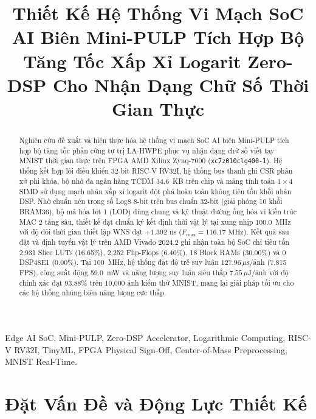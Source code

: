 \documentclass[conference]{IEEEtran}
\begin{document}
\title{Thiết Kế Hệ Thống Vi Mạch SoC AI Biên Mini-PULP Tích Hợp Bộ Tăng Tốc Xấp Xỉ Logarit Zero-DSP Cho Nhận Dạng Chữ Số Thời Gian Thực}

\author{
}

\maketitle

\begin{abstract}
Nghiên cứu đề xuất và hiện thực hóa hệ thống vi mạch SoC AI biên Mini-PULP tích hợp bộ tăng tốc phần cứng tự trị LA-HWPE phục vụ nhận dạng chữ số viết tay MNIST thời gian thực trên FPGA AMD Xilinx Zynq-7000 (\texttt{xc7z010clg400-1}). Hệ thống kết hợp lõi điều khiển 32-bit RISC-V RV32I, hệ thống bus thanh ghi CSR phân xử phi khóa, bộ nhớ đa ngân hàng TCDM 34.6~KB trên chip và mảng tính toán $1\times 4$ SIMD sử dụng mạch nhân xấp xỉ logarit đột phá hoàn toàn không tiêu tốn khối nhân DSP. Nhờ chuẩn nén trọng số Log8 8-bit trên bus chuẩn 32-bit (giải phóng 10 khối BRAM36), bộ mã hóa bit 1 (LOD) dùng chung và kỹ thuật đường ống hóa vi kiến trúc MAC 2 tầng sâu, thiết kế đạt chuẩn ký kết định thời vật lý tại xung nhịp 100.0~MHz với độ dôi thời gian thiết lập WNS đạt $+1.392\text{ ns}$ ($F_{\max} = 116.17\text{ MHz}$). Kết quả sau đặt và định tuyến vật lý trên AMD Vivado 2024.2 ghi nhận toàn bộ SoC chỉ tiêu tốn 2,931 Slice LUTs (16.65\%), 2,252 Flip-Flops (6.40\%), 18 Block RAMs (30.00\%) và 0 DSP48E1 (0.00\%). Tại 100~MHz, hệ thống đạt độ trễ suy luận $127.96\,\mu\text{s}$/ảnh (7,815 FPS), công suất động 59.0~mW và năng lượng suy luận siêu thấp $7.55\,\mu\text{J}$/ảnh với độ chính xác đạt 93.88\% trên 10,000 ảnh kiểm thử MNIST, mang lại giải pháp tối ưu cho các hệ thống nhúng biên năng lượng cực thấp.
\end{abstract}

\begin{IEEEkeywords}
Edge AI SoC, Mini-PULP, Zero-DSP Accelerator, Logarithmic Computing, RISC-V RV32I, TinyML, FPGA Physical Sign-Off, Center-of-Mass Preprocessing, MNIST Real-Time.
\end{IEEEkeywords}

\section{Đặt Vấn Đề và Động Lực Thiết Kế}
\label{sec:intro}
\end{document}
